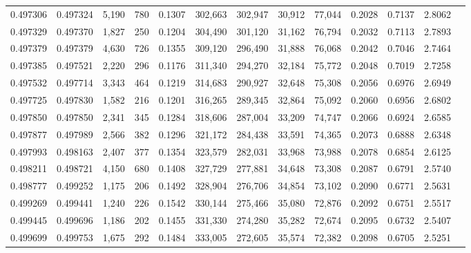 \begin{tabular}{rrrrrrrrrrrrr}
0.497306 & 0.497324 &  5,190 &   780 &                                     0.1307 & 302,663 & 302,947 &  30,912 &  77,044 & 0.2028 & 0.7137 & 2.8062 \\
0.497329 & 0.497370 &  1,827 &   250 &                                     0.1204 & 304,490 & 301,120 &  31,162 &  76,794 & 0.2032 & 0.7113 & 2.7893 \\
0.497379 & 0.497379 &  4,630 &   726 &                                     0.1355 & 309,120 & 296,490 &  31,888 &  76,068 & 0.2042 & 0.7046 & 2.7464 \\
0.497385 & 0.497521 &  2,220 &   296 &                                     0.1176 & 311,340 & 294,270 &  32,184 &  75,772 & 0.2048 & 0.7019 & 2.7258 \\
0.497532 & 0.497714 &  3,343 &   464 &                                     0.1219 & 314,683 & 290,927 &  32,648 &  75,308 & 0.2056 & 0.6976 & 2.6949 \\
0.497725 & 0.497830 &  1,582 &   216 &                                     0.1201 & 316,265 & 289,345 &  32,864 &  75,092 & 0.2060 & 0.6956 & 2.6802 \\
0.497850 & 0.497850 &  2,341 &   345 &                                     0.1284 & 318,606 & 287,004 &  33,209 &  74,747 & 0.2066 & 0.6924 & 2.6585 \\
0.497877 & 0.497989 &  2,566 &   382 &                                     0.1296 & 321,172 & 284,438 &  33,591 &  74,365 & 0.2073 & 0.6888 & 2.6348 \\
0.497993 & 0.498163 &  2,407 &   377 &                                     0.1354 & 323,579 & 282,031 &  33,968 &  73,988 & 0.2078 & 0.6854 & 2.6125 \\
0.498211 & 0.498721 &  4,150 &   680 &                                     0.1408 & 327,729 & 277,881 &  34,648 &  73,308 & 0.2087 & 0.6791 & 2.5740 \\
0.498777 & 0.499252 &  1,175 &   206 &                                     0.1492 & 328,904 & 276,706 &  34,854 &  73,102 & 0.2090 & 0.6771 & 2.5631 \\
0.499269 & 0.499441 &  1,240 &   226 &                                     0.1542 & 330,144 & 275,466 &  35,080 &  72,876 & 0.2092 & 0.6751 & 2.5517 \\
0.499445 & 0.499696 &  1,186 &   202 &                                     0.1455 & 331,330 & 274,280 &  35,282 &  72,674 & 0.2095 & 0.6732 & 2.5407 \\
0.499699 & 0.499753 &  1,675 &   292 &                                     0.1484 & 333,005 & 272,605 &  35,574 &  72,382 & 0.2098 & 0.6705 & 2.5251 \\

\end{tabular}
